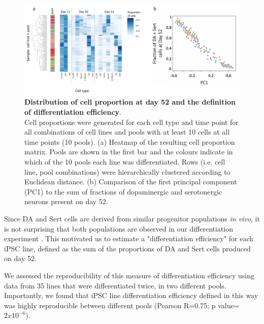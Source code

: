\begin{figure}[h]
\centering
\includegraphics[width=15.5cm]{Chapter5/Fig/neuroseq_define_diff_efficiency.png}
\caption[Definition of differentiation efficiency]{\textbf{Distribution of cell proportion at day 52 and the definition of differentiation efficiency}.\\
Cell proportions were generated for each cell type and time point for all combinations of cell lines and pools with at least 10 cells at all time points (10 pools). 
(a) Heatmap of the resulting cell proportion matrix. 
Pools are shown in the first bar and the colours indicate in which of the 10 pools each line was differentiated. 
Rows (i.e. cell line, pool combinations) were hierarchically clustered according to Euclidean distance. 
(b) Comparison of the first principal component (PC1) to the sum of fractions of dopaminergic and serotonergic neurons present on day 52.}
\label{fig:neuroseq_diff_efficiency}
\end{figure}

Since DA and Sert cells are derived from similar progenitor populations \textit{in vivo}, it is not surprising that both populations are observed in our differentiation experiment \cite{ye1998fgf}. 
This motivated us to estimate a "differentiation efficiency" for each iPSC line, defined as the sum of the proportions of DA and Sert cells produced on day 52.

We assessed the reproducibility of this measure of differentiation efficiency using data from 35 lines that were differentiated twice, in two different pools. 
Importantly, we found that iPSC line differentiation efficiency defined in this way was highly reproducible between different pools (Pearson R=0.75; p value=$2x10^{-6}$).

